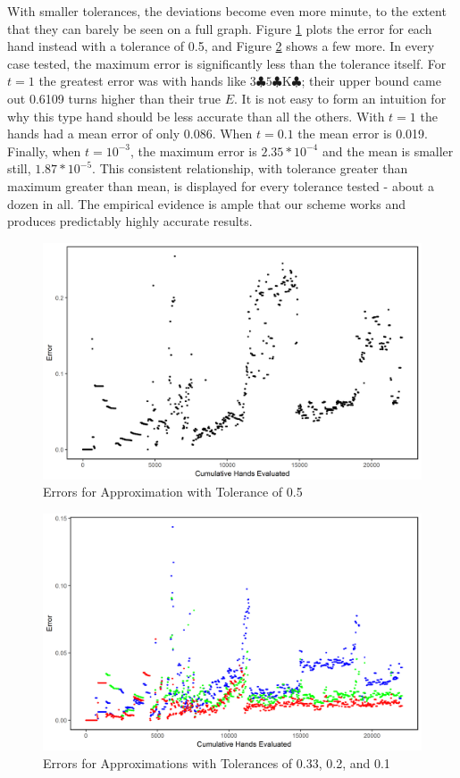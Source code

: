 \documentclass[letter,12pt]{article}
\begin{document}
With smaller tolerances, the deviations become even more minute, to the extent that they can barely be seen on a full graph. Figure \ref{fig:5} plots the error for each hand instead with a tolerance of 0.5, and Figure \ref{fig:6} shows a few more. In every case tested, the maximum error is significantly less than the tolerance itself. For $t=1$ the greatest error was with hands like $3\clubsuit 5\clubsuit \textrm{K}\clubsuit$; their upper bound came out 0.6109 turns higher than their true $E$. It is not easy to form an intuition for why this type hand should be less accurate than all the others. With $t=1$ the hands had a mean error of only 0.086. When $t=0.1$ the mean error is 0.019. Finally, when $t=10^{-3}$, the maximum error is $2.35*10^{-4}$ and the mean is smaller still, $1.87 * 10^{-5}$. This consistent relationship, with tolerance greater than maximum greater than mean, is displayed for every tolerance tested - about a dozen in all. The empirical evidence is ample that our scheme works and produces predictably highly accurate results.

\begin{figure}
\includegraphics[width=\textwidth]{fig5.png}
\caption{Errors for Approximation with Tolerance of 0.5}\label{fig:5}
\end{figure}

\begin{figure}
\includegraphics[width=\textwidth]{fig6.png}
\caption{Errors for Approximations with Tolerances of 0.33, 0.2, and 0.1}\label{fig:6}
\end{figure}
\end{document}
